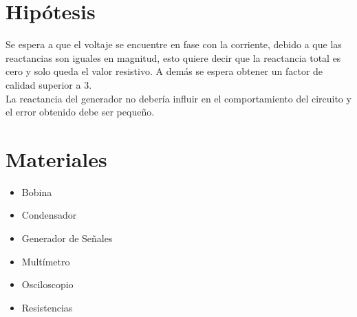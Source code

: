 \documentclass[twocolumn]{IEEEtran}
\begin{document}
\section{Hipótesis}
\noindent
Se espera a que el voltaje se encuentre en fase con la corriente, debido a que las reactancias son iguales en magnitud, esto quiere decir que la reactancia total es cero y solo queda el valor resistivo. A demás se espera obtener un factor de calidad superior a $3$.\\
La reactancia del generador no debería influir en el comportamiento del circuito y el error obtenido debe ser pequeño.


\section{Materiales}
\begin{itemize}
 \item Bobina
 \item Condensador
 \item Generador de Señales
 \item Multímetro
 \item Osciloscopio
 \item Resistencias
\end{itemize}
\end{document}

